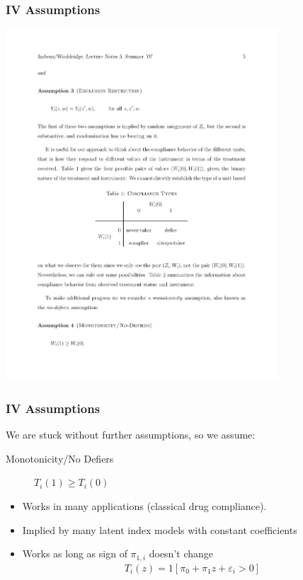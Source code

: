 \begin{frame}
\frametitle{IV Assumptions}
\includegraphics[width=4in]{./resources/imbens1.pdf}
\end{frame}



\begin{frame}
\frametitle{IV Assumptions}
We are stuck without further assumptions, so we assume:
\begin{description}
\item [Monotonicity/No Defiers] $T_i(1) \geq T_i(0)$
\end{description}
\begin{itemize}
\item Works in many applications (classical drug compliance).
\item Implied by many latent index models with constant coefficients
\item Works as long as sign of $\pi_{1,i}$ doesn't change
\begin{eqnarray*}
T_i(z)  = 1 [\pi_0 + \pi_1 z + \varepsilon_i > 0]
\end{eqnarray*}
\end{itemize}
\end{frame}


